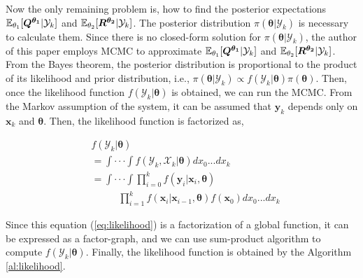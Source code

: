 Now the only remaining problem is, how to find the posterior expectations $\mathbb{E}_{\theta_1}[\bm {Q^{\theta_1}}|\mathcal{Y}_k]$ and $\mathbb{E}_{\theta_2}[\bm{R^{\theta_2}}|\mathcal{Y}_k]$. The posterior distribution $\pi(\bm{\theta}|\mathcal{Y}_k)$ is necessary to calculate them. Since there is no closed-form solution for $\pi(\bm{\theta}|\mathcal{Y}_k)$, the author of this paper employs MCMC to approximate $\mathbb{E}_{\theta_1}[\bm {Q^{\theta_1}}|\mathcal{Y}_k]$ and $\mathbb{E}_{\theta_2}[\bm{R^{\theta_2}}|\mathcal{Y}_k]$. From the Bayes theorem, the posterior distribution is proportional to the product of its likelihood and prior distribution, i.e., $\pi (\bm{\theta}|\mathcal{Y}_k) \propto f(\mathcal{Y}_k|\bm{\theta})\pi(\bm{\theta})$. Then, once the likelihood function $f(\mathcal{Y}_k|\bm{\theta})$ is obtained, we can run the MCMC. From the Markov assumption of the system, it can be assumed that $\bm{y}_k$ depends only on $\bm{x}_k$ and $\bm{\theta}$. Then, the likelihood function is factorized as,

\begin{align} \label{eq:likelihood}
&f(\mathcal{Y}_k|\bm{\theta}) \nonumber\\
& = \int\cdot\cdot\cdot\int f(\mathcal{Y}_k, \mathcal{X}_k|\bm{\theta})dx_0...dx_k \nonumber\\
& = \int\cdot\cdot\cdot\int \prod^{k}_{i=0}f(\bm{y}_i| \bm{x}_i,\bm{\theta})\nonumber\\
&\;\;\;\;\;\;\;\;\;\;\prod^{k}_{i=1}f(\bm{x}_i|\bm{x}_{i-1}, \bm{\theta})f(\bm{x}_0)dx_0...dx_k
\end{align}

Since this equation (\ref{eq:likelihood}) is a factorization of a global function, it can be expressed as a factor-graph, and we can use sum-product algorithm\cite{Kschischang2001} to compute $f(\mathcal{Y}_k|\bm{\theta})$. Finally, the likelihood function is obtained by the Algorithm \ref{al:likelihood}.

